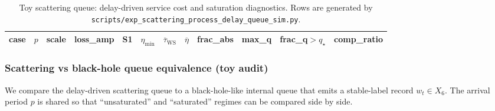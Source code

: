\begin{table}[t]
\centering
\scriptsize
\setlength{\tabcolsep}{6pt}
\renewcommand{\arraystretch}{1.15}
\begin{tabular}{c r r r l r r r r r r r}
\toprule
case & $p$ & scale & loss\_amp & S1 & $\eta_{\min}$ & $\overline{\tau}_{\mathrm{WS}}$ & $\overline{\eta}$ & frac\_abs & max\_q & frac\_q$>q_\star$ & comp\_ratio \\
\midrule

\end{tabular}
\caption{Toy scattering queue: delay-driven service cost and saturation diagnostics. Rows are generated by \texttt{scripts/exp\_scattering\_process\_delay\_queue\_sim.py}.}
\label{tab:scattering_process_delay_queue_toy}
\end{table}

%

\subsubsection{Scattering vs black-hole queue equivalence (toy audit)}
\label{subsec:scattering_bh_queue_equivalence_toy}

\AuditTag We compare the delay-driven scattering queue to a black-hole-like internal queue that emits a stable-label record $w_t\in X_6$.
The arrival period $p$ is shared so that ``unsaturated'' and ``saturated'' regimes can be compared side by side.

\begin{table}[t]
\centering
\scriptsize
\setlength{\tabcolsep}{6pt}
\renewcommand{\arraystretch}{1.15}
%
\caption{Toy equivalence audit: saturation/backlog and record compressibility proxies for scattering versus a black-hole-like queue. Rows are generated by \texttt{scripts/exp\_scattering\_bh\_queue\_equivalence\_audit.py}.}
\label{tab:scattering_bh_queue_equivalence_toy}
\end{table}

